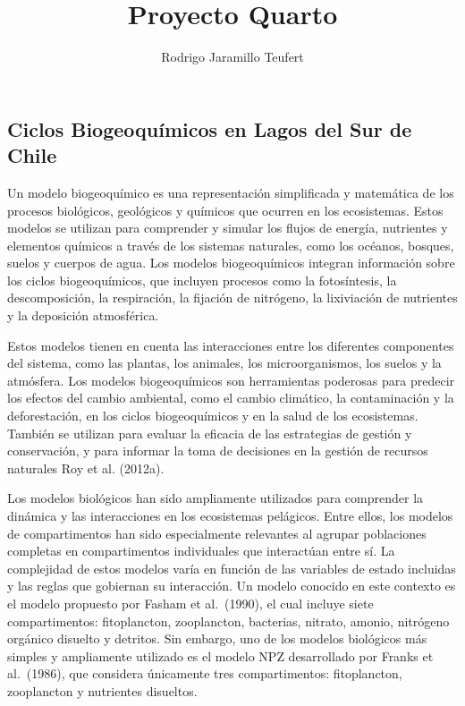 \documentclass[
  letterpaper,
  DIV=11,
  numbers=noendperiod]{scrartcl}
\title{Proyecto Quarto}
\author{Rodrigo Jaramillo Teufert}
\date{}
\begin{document}
\maketitle
\ifdefined\Shaded\renewenvironment{Shaded}{\begin{tcolorbox}[boxrule=0pt, interior hidden, enhanced, frame hidden, borderline west={3pt}{0pt}{shadecolor}, sharp corners, breakable]}{\end{tcolorbox}}\fi

\hypertarget{Resumen}{%
\subsection{Ciclos Biogeoquímicos en Lagos del Sur de
Chile}\label{Resumen}}

Un modelo biogeoquímico es una representación simplificada y matemática
de los procesos biológicos, geológicos y químicos que ocurren en los
ecosistemas. Estos modelos se utilizan para comprender y simular los
flujos de energía, nutrientes y elementos químicos a través de los
sistemas naturales, como los océanos, bosques, suelos y cuerpos de agua.
Los modelos biogeoquímicos integran información sobre los ciclos
biogeoquímicos, que incluyen procesos como la fotosíntesis, la
descomposición, la respiración, la fijación de nitrógeno, la lixiviación
de nutrientes y la deposición atmosférica.

Estos modelos tienen en cuenta las interacciones entre los diferentes
componentes del sistema, como las plantas, los animales, los
microorganismos, los suelos y la atmósfera. Los modelos biogeoquímicos
son herramientas poderosas para predecir los efectos del cambio
ambiental, como el cambio climático, la contaminación y la
deforestación, en los ciclos biogeoquímicos y en la salud de los
ecosistemas. También se utilizan para evaluar la eficacia de las
estrategias de gestión y conservación, y para informar la toma de
decisiones en la gestión de recursos naturales Roy et al. (2012a).

Los modelos biológicos han sido ampliamente utilizados para comprender
la dinámica y las interacciones en los ecosistemas pelágicos. Entre
ellos, los modelos de compartimentos han sido especialmente relevantes
al agrupar poblaciones completas en compartimentos individuales que
interactúan entre sí. La complejidad de estos modelos varía en función
de las variables de estado incluidas y las reglas que gobiernan su
interacción. Un modelo conocido en este contexto es el modelo propuesto
por Fasham et al.~(1990), el cual incluye siete compartimentos:
fitoplancton, zooplancton, bacterias, nitrato, amonio, nitrógeno
orgánico disuelto y detritos. Sin embargo, uno de los modelos biológicos
más simples y ampliamente utilizado es el modelo NPZ desarrollado por
Franks et al.~(1986), que considera únicamente tres compartimentos:
fitoplancton, zooplancton y nutrientes disueltos.
\end{document}
